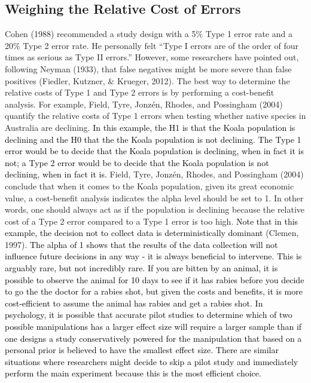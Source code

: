 \documentclass[
  english,
  ,man, a4paper,floatsintext]{apa6}
\begin{document}
\hypertarget{weighing-the-relative-cost-of-errors}{%
\subsection{Weighing the Relative Cost of Errors}\label{weighing-the-relative-cost-of-errors}}

Cohen (1988) recommended a study design with a 5\% Type 1 error rate and a 20\% Type 2 error rate. He personally felt ``Type I errors are of the order of four times as serious as Type II errors.'' However, some researchers have pointed out, following Neyman (1933), that false negatives might be more severe than false positives (Fiedler, Kutzner, \& Krueger, 2012). The best way to determine the relative costs of Type 1 and Type 2 errors is by performing a cost-benefit analysis. For example, Field, Tyre, Jonzén, Rhodes, and Possingham (2004) quantify the relative costs of Type 1 errors when testing whether native species in Australia are declining. \textcolor{black}{In this example, the H1 is that the Koala population is declining and the H0 that the the Koala population is not declining. The Type 1 error would be to decide that the Koala population is declining, when in fact it is not; a Type 2 error would be to decide that the Koala population is not declining, when in fact it is.} Field, Tyre, Jonzén, Rhodes, and Possingham (2004) conclude that when it comes to the Koala population, given its great economic value, a cost-benefit analysis indicates the alpha level should be set to 1. In other words, one should always act as if the population is declining because the relative cost of a Type 2 error compared to a Type 1 error is too high.
\textcolor{black}{Note that in this example, the decision not to collect data is deterministically dominant} (Clemen, 1997). \textcolor{black}{The alpha of 1 shows that the results of the data collection will not influence future decisions in any way - it is always beneficial to intervene. This is arguably rare, but not incredibly rare. If you are bitten by an animal, it is possible to observe the animal for 10 days to see if it has rabies before you decide to go the the doctor for a rabies shot, but given the costs and benefits, it is more cost-efficient to assume the animal has rabies and get a rabies shot. In psychology, it is possible that accurate pilot studies to determine which of two possible manipulations has a larger effect size will require a larger sample than if one designs a study conservatively powered for the manipulation that based on a personal prior is believed to have the smallest effect size. There are similar situations where researchers might decide to skip a pilot study and immediately perform the main experiment because this is the most efficient choice.}
\end{document}
